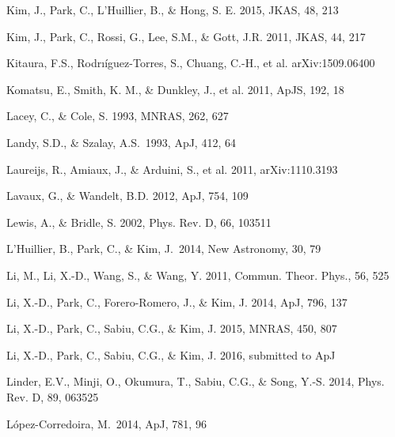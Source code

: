 \documentclass[iop]{emulateapj}
\begin{document}
\begin{thebibliography}{}
Kim, J., Park, C., L'Huillier, B., \& Hong, S. E. 2015, JKAS, 48, 213

Kim, J., Park, C., Rossi, G., Lee, S.M., \& Gott, J.R. 2011, JKAS, 44, 217  

Kitaura, F.S., Rodrı\'{i}guez-Torres, S., Chuang, C.-H., et al. arXiv:1509.06400

Komatsu, E., Smith, K. M., \& Dunkley, J., et al. 2011, ApJS, 192, 18  

Lacey, C., \& Cole, S. 1993, MNRAS, 262, 627


Landy, S.D., \& Szalay, A.S.\ 1993, ApJ, 412, 64 

Laureijs, R., Amiaux, J., \& Arduini, S., et al. 2011, arXiv:1110.3193

Lavaux, G., \& Wandelt, B.D. 2012, ApJ, 754, 109  


Lewis, A., \& Bridle, S. 2002, Phys. Rev. D, 66, 103511

L'Huillier, B., Park, C., \& Kim, J.\ 2014, New Astronomy, 30, 79 

Li, M., Li, X.-D., Wang, S., \& Wang, Y. 2011, Commun. Theor. Phys., 56, 525

Li, X.-D., Park, C., Forero-Romero, J., \& Kim, J. 2014, ApJ, 796, 137

Li, X.-D., Park, C., Sabiu, C.G., \& Kim, J. 2015, MNRAS, 450, 807 

Li, X.-D., Park, C., Sabiu, C.G., \& Kim, J. 2016, submitted to ApJ



Linder, E.V., Minji, O., Okumura, T., Sabiu, C.G., \& Song, Y.-S. 2014, Phys. Rev. D, 89, 063525  

L{\'o}pez-Corredoira, M.\ 2014, ApJ, 781, 96 


\end{thebibliography}
\end{document}
